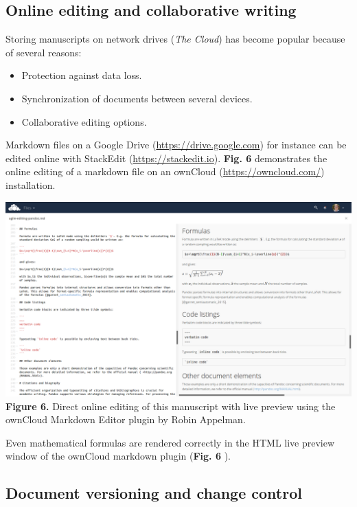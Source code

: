 \documentclass[10pt,fleqn]{wlpeerj}
\providecommand{\tightlist}{%
  \setlength{\itemsep}{0pt}\setlength{\parskip}{0pt}}
\begin{document}
\subsection{Online
editing
and
collaborative
writing}\label{online-editing-and-collaborative-writing}

Storing
manuscripts
on
network
drives
(\emph{The
Cloud})
has
become
popular
because
of
several
reasons:

\begin{itemize}
\tightlist
\item
  Protection
  against
  data
  loss.
\item
  Synchronization
  of
  documents
  between
  several
  devices.
\item
  Collaborative
  editing
  options.
\end{itemize}

Markdown
files
on a
Google
Drive
(\url{https://drive.google.com})
for
instance
can
be
edited
online
with
StackEdit
(\url{https://stackedit.io}).
\textbf{Fig.
6}
demonstrates
the
online
editing
of a
markdown
file
on an
ownCloud
(\url{https://owncloud.com/})
installation.

\includegraphics{fig-owncloud-md-editor.png}
\textbf{Figure
6.}
Direct
online
editing
of
this
manuscript
with
live
preview
using
the
ownCloud
Markdown
Editor
plugin
by
Robin
Appelman.

Even
mathematical
formulas
are
rendered
correctly
in
the
HTML
live
preview
window
of
the
ownCloud
markdown
plugin
(\textbf{Fig.
6} ).

\subsection{Document
versioning
and
change
control}\label{document-versioning-and-change-control}
\end{document}

